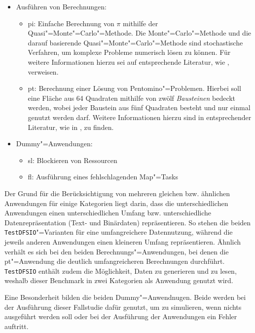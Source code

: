 \begin{itemize}
    \item Ausführen von Berechnungen:
    \begin{itemize}
        \item \acrlong{pi}: Einfache Berechnung von $\pi$ mithilfe der Quasi"=Monte"=Carlo"=Methode.
            Die Monte"=Carlo"=Methode und die darauf basierende Quasi"=Monte"=Carlo"=Methode sind stochastische Verfahren, um komplexe Probleme numerisch lösen zu können.
            Für weitere Informationen hierzu sei auf entsprechende Literatur, wie \zB \cite{Korn2010,Lemieux2009}, verweisen.
        \item \gls{pt}: Berechnung einer Lösung von Pentomino"=Problemen.
            Hierbei soll eine Fläche aus 64 Quadraten mithilfe von zwölf \emph{Bausteinen} bedeckt werden, wobei jeder Baustein aus fünf Quadraten besteht und nur einmal genutzt werden darf.
            Weitere Informationen hierzu sind in entsprechender Literatur, wie \zB in \cite{Golomb1995}, zu finden.
    \end{itemize}

    \item Dummy"=Anwendungen:
    \begin{itemize}
        \item \gls{sl}: Blockieren von Ressourcen
        \item \gls{fl}: Ausführung eines fehlschlagenden Map"=Tasks
    \end{itemize}
\end{itemize}

Der Grund für die Berücksichtigung von mehreren gleichen bzw. ähnlichen Anwendungen für einige Kategorien liegt darin, dass die unterschiedlichen Anwendungen einen unterschiedlichen Umfang bzw. unterschiedliche Datenrepräsentation (Text- und Binärdaten) repräsentieren.
So stehen die beiden \texttt{TestDFSIO}"=Varianten für eine umfangreichere Datennutzung, während die jeweils anderen Anwendungen einen kleineren Umfang repräsentieren.
Ähnlich verhält es sich bei den beiden Berechnungs"=Anwendungen, bei denen die \acrlong{pt}"=Anwendung die deutlich umfangreicheren Berechnungen durchführt.
\texttt{TestDFSIO} enthält zudem die Möglichkeit, Daten zu generieren und zu lesen, weshalb dieser Benchmark in zwei Kategorien als Anwendung genutzt wird.

Eine Besonderheit bilden die beiden Dummy"=Anwendnugen.
Beide werden bei der Ausführung dieser Fallstudie dafür genutzt, um zu simulieren, wenn nichts ausgeführt werden soll oder bei der Ausführung der Anwendungen ein Fehler auftritt.


